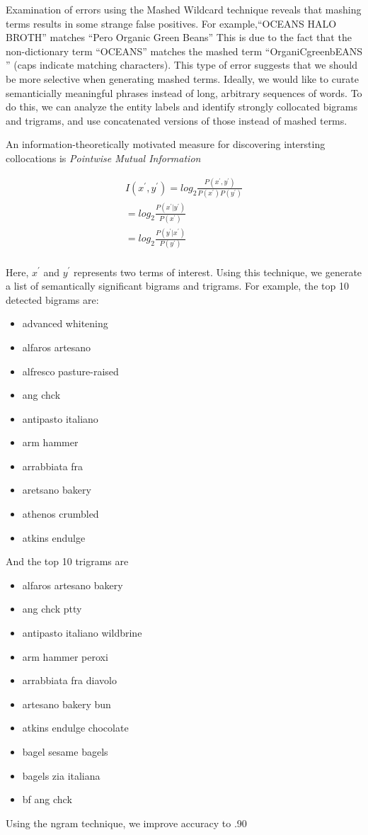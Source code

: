 \documentclass[11pt,a4paper]{article}
\newenvironment{myitemize}
{ \begin{itemize}
    \setlength{\itemsep}{0pt}
    \setlength{\parskip}{0pt}
    \setlength{\parsep}{0pt}     }
{ \end{itemize}                  }
\begin{document}
Examination of errors using the Mashed Wildcard technique reveals that
mashing terms results in some strange false positives.
For example,``OCEANS HALO BROTH'' matches ``Pero Organic Green Beans''
This is due to the fact that the non-dictionary term ``OCEANS''
matches the mashed term ``OrganiCgreenbEANS '' (caps indicate matching
characters).  This type of error suggests that we should be more
selective when generating mashed terms.  Ideally, we would like to
curate semanticially meaningful phrases instead of long, arbitrary
sequences of words.  To do this, we can analyze the entity labels and
identify strongly collocated bigrams and trigrams, and use
concatenated versions of those instead of mashed terms.

An information-theoretically motivated measure for discovering
intersting collocations is {\em Pointwise Mutual Information}~\cite{manning:1999}

\begin{equation}
\begin{split}
  \label{eq:pmi}
  I(x^\prime,y^\prime) = log_2\frac{P(x^\prime,y^\prime)}{ P(x^\prime)P(y^\prime) } \\
  = log_2\frac{P(x^\prime|y^\prime)}{ P(x^\prime) } \\
  = log_2\frac{P(y^\prime|x^\prime)}{ P(y^\prime) } \\
\end{split}
\end{equation}

Here, $x^\prime$ and $y^\prime$ represents two terms of interest.
Using this technique, we generate a list of semantically significant
bigrams and trigrams.  For example, the top 10 detected bigrams are:
\begin{myitemize}
\item advanced whitening
\item alfaros artesano
\item alfresco pasture-raised
\item ang chck
\item antipasto italiano
\item arm hammer
\item arrabbiata fra
\item aretsano bakery
\item athenos crumbled
\item atkins endulge
\end{myitemize}
And the top 10 trigrams are
\begin{myitemize}
\item alfaros artesano bakery
\item ang chck ptty
\item antipasto italiano wildbrine
\item arm hammer peroxi
\item arrabbiata fra diavolo
\item artesano bakery bun
\item atkins endulge chocolate
\item bagel sesame bagels
\item bagels zia italiana
\item bf ang chck
\end{myitemize}
Using the ngram technique, we improve accuracy to .90
\end{document}
